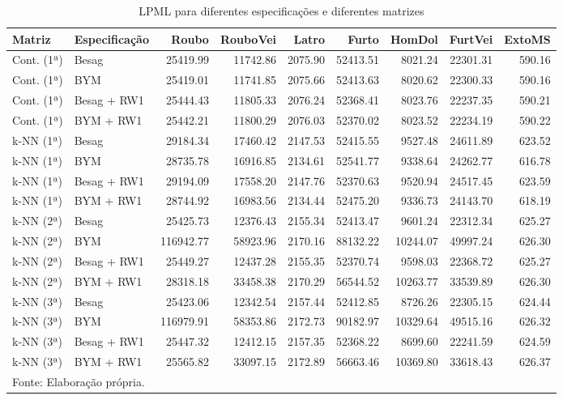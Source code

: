 \documentclass[12pt,openright,oneside,a4paper,english,french,spanish]{abntex2}
\numberwithin{table}{section} %
\numberwithin{figure}{section} %
\begin{document}
\begin{table}[H]
\begin{center}
\begin{tiny}
\caption{LPML para diferentes especificações e diferentes matrizes}
\label{tab:LPML}
\centering
\begin{tabular}{llrrrrrrr}
  \hline
Matriz & Especificação & Roubo & RouboVei & Latro & Furto & HomDol & FurtVei & ExtoMS \\ 
  \hline
Cont. (1ª) & Besag & 25419.99 & 11742.86 & 2075.90 & 52413.51 & 8021.24 & 22301.31 & 590.16 \\ 
Cont. (1ª) & BYM & 25419.01 & 11741.85 & 2075.66 & 52413.63 & 8020.62 & 22300.33 & 590.16 \\ 
Cont. (1ª) & Besag + RW1 & 25444.43 & 11805.33 & 2076.24 & 52368.41 & 8023.76 & 22237.35 & 590.21 \\ 
Cont. (1ª) & BYM + RW1 & 25442.21 & 11800.29 & 2076.03 & 52370.02 & 8023.52 & 22234.19 & 590.22 \\ 
k-NN (1ª) & Besag & 29184.34 & 17460.42 & 2147.53 & 52415.55 & 9527.48 & 24611.89 & 623.52 \\ 
k-NN (1ª) & BYM & 28735.78 & 16916.85 & 2134.61 & 52541.77 & 9338.64 & 24262.77 & 616.78 \\ 
k-NN (1ª) & Besag + RW1 & 29194.09 & 17558.20 & 2147.76 & 52370.63 & 9520.94 & 24517.45 & 623.59 \\ 
k-NN (1ª) & BYM + RW1 & 28744.92 & 16983.56 & 2134.44 & 52475.20 & 9336.73 & 24143.70 & 618.19 \\ 
k-NN (2ª) & Besag & 25425.73 & 12376.43 & 2155.34 & 52413.47 & 9601.24 & 22312.34 & 625.27 \\ 
k-NN (2ª) & BYM & 116942.77 & 58923.96 & 2170.16 & 88132.22 & 10244.07 & 49997.24 & 626.30 \\ 
k-NN (2ª) & Besag + RW1 & 25449.27 & 12437.28 & 2155.35 & 52370.74 & 9598.03 & 22368.72 & 625.27 \\ 
k-NN (2ª) & BYM + RW1 & 28318.18 & 33458.38 & 2170.29 & 56544.52 & 10263.77 & 33539.89 & 626.30 \\ 
k-NN (3ª) & Besag & 25423.06 & 12342.54 & 2157.44 & 52412.85 & 8726.26 & 22305.15 & 624.44 \\ 
k-NN (3ª) & BYM & 116979.91 & 58353.86 & 2172.73 & 90182.97 & 10329.64 & 49515.16 & 626.32 \\ 
k-NN (3ª) & Besag + RW1 & 25447.32 & 12412.15 & 2157.35 & 52368.22 & 8699.60 & 22241.59 & 624.59 \\ 
k-NN (3ª) & BYM + RW1 & 25565.82 & 33097.15 & 2172.89 & 56663.46 & 10369.80 & 33618.43 & 626.37 \\ 
   \hline
\multicolumn{9}{l}{Fonte: Elaboração própria.}
\end{tabular}
\end{tiny}
\end{center}
\end{table}
\end{document}
